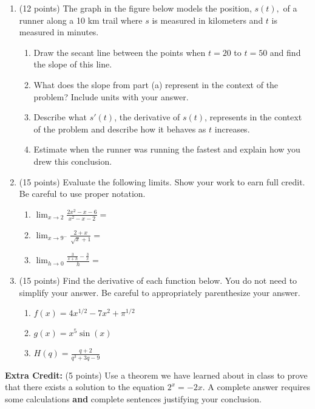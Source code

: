 \documentclass[12pt]{article}
\renewcommand{\emph}[1]{\textsf{\textbf{#1}}}
\begin{document}
\begin{enumerate}
\item (12 points) The graph in the figure below models the position, $s(t),$ of a runner along a 10 km trail where $s$ is measured in kilometers and $t$ is measured in minutes.\\
\begin{center}
\end{center}
\begin{enumerate}
\item Draw the secant line between the points when $t=20$ to $t=50$ and find the slope of this line. 
\vfill
\item What does the slope from part (a) represent in the context of the problem? Include units with your answer.
\vfill
\item Describe what $s'(t)$, the derivative of $s(t)$, represents in the context of the problem and describe how it behaves as $t$ increases. 
\vfill 

\item Estimate when the runner was running the fastest and explain how you drew this conclusion.
\vfill
\end{enumerate}
\newpage
\item (15 points) Evaluate the following limits. Show your work to earn full credit. Be careful to use proper notation.
	\begin{enumerate}
	\item $\displaystyle{\lim_{x \to2 } \frac{2x^2-x-6}{x^2-x-2}= }$
	\vfill
	\item $\displaystyle{\lim_{x \to 9^-} \frac{2+x}{\sqrt{x} +1} =}$
	\vfill
	\item $\displaystyle{\lim_{h \to 0} \frac{\frac{3}{x+h}-\frac{3}{x}}{h}= }$
	\vfill
	\end{enumerate}
\newpage
\item (15 points) Find the derivative of each function below. You do not need to simplify your answer. Be careful to appropriately parenthesize your answer.
	\begin{enumerate}
	\item $f(x)=4x^{1/2}-7x^2+\pi^{1/2}$
	\vfill
	\item $g(x)=x^5\sin(x)$
	\vfill
	\item $H(q)=\frac{q+2}{q^3+3q-9}$
	\vfill
	\end{enumerate}

\end{enumerate}
\textbf{Extra Credit:} (5 points) Use a theorem we have learned about in class to prove that there exists a solution to the equation $2^x=-2x.$ A complete answer requires some calculations \emph{and} complete sentences justifying your conclusion.
\vspace{2.5in}
\end{document}

